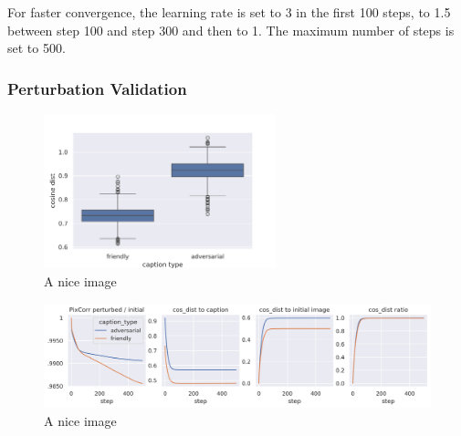 For faster convergence, the learning rate is set to 3 in the first 100 steps, to 1.5 between step 100 and step 300 and then to 1. The maximum number of steps is set to 500.

\subsubsection{Perturbation Validation}

\begin{figure}[ht]
    \centering
    \includegraphics[width=0.6\textwidth]{plots/advpert_sanity_check_friendly_vs_adversarial_cap.png}
    \caption{A nice image}\label{fig:advpert_sanity_check_friendly_vs_adversarial_cap}
\end{figure}


\begin{figure}[ht]
    \centering
    \includegraphics[width=1\textwidth]{plots/advpert_validation_ic_loss_curves.png}
    \caption{A nice image}\label{fig:advpert_validation_ic_loss_curves}
\end{figure}




